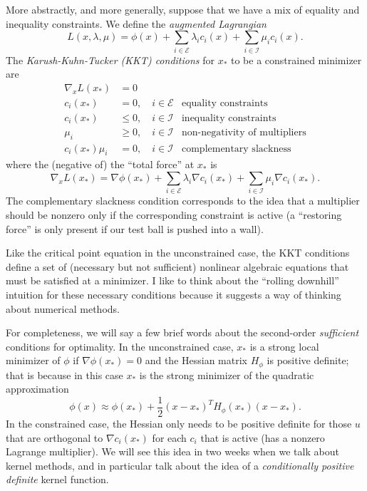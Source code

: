 \documentclass[12pt, leqno]{article} %
\begin{document}
More abstractly, and more generally, suppose that we have a mix of
equality and inequality constraints.  We define
the {\em augmented Lagrangian}
\[
  L(x, \lambda, \mu) = \phi(x) +
    \sum_{i \in \mathcal{E}} \lambda_i c_i(x) +
    \sum_{i \in \mathcal{I}} \mu_i c_i(x).
\]
The {\em Karush-Kuhn-Tucker (KKT) conditions} for $x_*$ to be a
constrained minimizer are
\begin{align*}
  \nabla_x L(x_*) &= 0 \\
  c_i(x_*) &= 0, \quad i \in \mathcal{E}
  & \mbox{equality constraints}\\
  c_i(x_*) & \leq 0, \quad i \in \mathcal{I}
  & \mbox{inequality constraints}\\
  \mu_i & \geq 0, \quad i \in \mathcal{I}
  & \mbox{non-negativity of multipliers}\\
  c_i(x_*) \mu_i &= 0, \quad i \in \mathcal{I}
  & \mbox{complementary slackness}
\end{align*}
where the (negative of) the ``total force'' at $x_*$ is
\[
  \nabla_x L(x_*) = \nabla \phi(x_*) +
    \sum_{i\in \mathcal{E}} \lambda_i \nabla c_i(x_*) +
    \sum_{i\in \mathcal{I}} \mu_i \nabla c_i(x_*).
\]
The complementary slackness condition corresponds to the idea that a
multiplier should be nonzero only if the corresponding constraint is
active (a ``restoring force'' is only present if our test ball
is pushed into a wall).

Like the critical point equation in the unconstrained case, the KKT
conditions define a set of (necessary but not sufficient) nonlinear
algebraic equations that must be satisfied at a minimizer.  I like to
think about the ``rolling downhill'' intuition for these necessary
conditions because it suggests a way of thinking about numerical
methods.

For completeness, we will say a few brief words about
the second-order {\em sufficient} conditions for optimality.
In the unconstrained case, $x_*$ is a strong
local minimizer of $\phi$ if $\nabla \phi(x_*) = 0$ and
the Hessian matrix $H_{\phi}$ is positive definite; that is because
in this case $x_*$ is the strong minimizer of the quadratic approximation
\[
  \phi(x) \approx \phi(x_*) + \frac{1}{2} (x-x_*)^T H_\phi(x_*) (x-x_*).
\]
In the constrained case, the Hessian only needs to be positive
definite for those $u$ that are orthogonal to $\nabla c_i(x_*)$
for each $c_i$ that is active (has a nonzero Lagrange multiplier).
We will see this idea in two weeks when we talk about kernel methods,
and in particular talk about the idea of
a {\em conditionally positive definite} kernel function.
\end{document}
